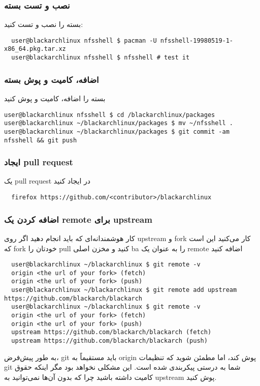\documentclass[a4paper, oneside, 11pt]{book}
\def\href#1#2{\htmladdnormallink{#2}{#1}}
\begin{document}
\subsubsection{نصب و تست بسته}
بسته را نصب و تست کنید:
\begin{lstlisting}
  user@blackarchlinux nfsshell $ pacman -U nfsshell-19980519-1-x86_64.pkg.tar.xz
  user@blackarchlinux nfsshell $ nfsshell # test it
\end{lstlisting}

\subsubsection{اضافه، کامیت و پوش بسته}
بسته را اضافه، کامیت و پوش کنید
\begin{lstlisting}user@blackarchlinux nfsshell $ cd /blackarchlinux/packages
user@blackarchlinux ~/blackarchlinux/packages $ mv ~/nfsshell .
user@blackarchlinux ~/blackarchlinux/packages $ git commit -am nfsshell && git push
\end{lstlisting}

\subsubsection{ایجاد pull request}
یک pull request در \href{https://github.com/}{github.com} ایجاد کنید
\begin{lstlisting}
  firefox https://github.com/<contributor>/blackarchlinux
\end{lstlisting}

\subsubsection{اضافه کردن یک remote برای upstream}
کار هوشمندانه‌ای که باید انجام دهید اگر روی upstream و fork کار می‌کنید این است که fork خودتان را pull کنید و مخزن اصلی ba را به عنوان یک remote اضافه کنید
\begin{lstlisting}
  user@blackarchlinux ~/blackarchlinux $ git remote -v
  origin <the url of your fork> (fetch)
  origin <the url of your fork> (push)
  user@blackarchlinux ~/blackarchlinux $ git remote add upstream https://github.com/blackarch/blackarch
  user@blackarchlinux ~/blackarchlinux $ git remote -v
  origin <the url of your fork> (fetch)
  origin <the url of your fork> (push)
  upstream https://github.com/blackarch/blackarch (fetch)
  upstream https://github.com/blackarch/blackarch (push)
\end{lstlisting}

به طور پیش‌فرض، git باید مستقیماً به origin پوش کند، اما مطمئن شوید که تنظیمات git شما
به درستی پیکربندی شده است. این مشکلی نخواهد بود مگر اینکه حقوق کامیت داشته باشید چرا که
بدون آن‌ها نمی‌توانید به upstream پوش کنید.
\end{document}
